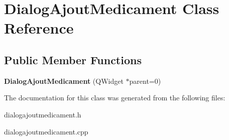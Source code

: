 \hypertarget{classDialogAjoutMedicament}{\section{Dialog\-Ajout\-Medicament Class Reference}
\label{classDialogAjoutMedicament}
}
\subsection*{Public Member Functions}
\begin{DoxyCompactItemize}
\item 
\hypertarget{classDialogAjoutMedicament_a9c1095e61714c053e004c73dd5ba0565}{{\bfseries Dialog\-Ajout\-Medicament} (Q\-Widget $\ast$parent=0)}\label{classDialogAjoutMedicament_a9c1095e61714c053e004c73dd5ba0565}

\end{DoxyCompactItemize}


The documentation for this class was generated from the following files\-:\begin{DoxyCompactItemize}
\item 
dialogajoutmedicament.\-h\item 
dialogajoutmedicament.\-cpp\end{DoxyCompactItemize}
